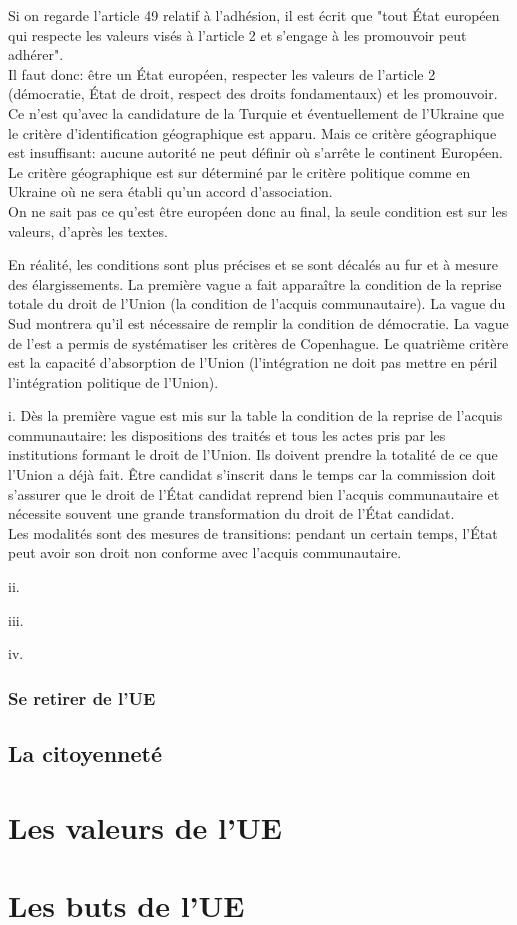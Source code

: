 \documentclass[12pt, a4paper, openany]{book}
\begin{document}
Si on regarde l'article 49 relatif à l'adhésion, il est écrit que "tout État européen qui respecte les valeurs visés à l'article 2 et s'engage à les promouvoir peut adhérer". \\
Il faut donc: être un État européen, respecter les valeurs de l'article 2 (démocratie, État de droit, respect des droits fondamentaux) et les promouvoir. \\
Ce n'est qu'avec la candidature de la Turquie et éventuellement de l'Ukraine que le critère d'identification géographique est apparu. Mais ce critère géographique est insuffisant: aucune autorité ne peut définir où s'arrête le continent Européen. Le critère géographique est sur déterminé par le critère politique comme en Ukraine où ne sera établi qu'un accord d'association. \\
On ne sait pas ce qu'est être européen donc au final, la seule condition est sur les valeurs, d'après les textes.


En réalité, les conditions sont plus précises et se sont décalés au fur et à mesure des élargissements. La première vague a fait apparaître la condition de la reprise totale du droit de l'Union (la condition de l'acquis communautaire). La vague du Sud montrera qu'il est nécessaire de remplir la condition de démocratie. La vague de l'est a permis de systématiser les critères de Copenhague. Le quatrième critère est la capacité d'absorption de l'Union (l'intégration ne doit pas mettre en péril l'intégration politique de l'Union).


i. Dès la première vague est mis sur la table la condition de la reprise de l'acquis communautaire: les dispositions des traités et tous les actes pris par les institutions formant le droit de l'Union. Ils doivent prendre la totalité de ce que l'Union a déjà fait. Être candidat s'inscrit dans le temps car la commission doit s'assurer que le droit de l'État candidat reprend bien l'acquis communautaire et nécessite souvent une grande transformation du droit de l'État candidat. \\
Les modalités sont des mesures de transitions: pendant un certain temps, l'État peut avoir son droit non conforme avec l'acquis communautaire. 


ii.



iii.



iv. 


\subsection{Se retirer de l'UE}



\section{La citoyenneté}


\chapter{Les valeurs de l'UE}








\chapter{Les buts de l'UE}
\end{document}
